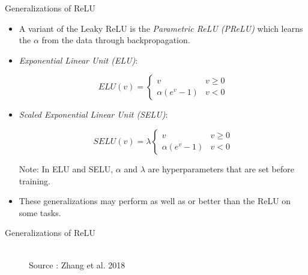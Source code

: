 \begin{frame} {Generalizations of ReLU}
  \begin{itemize}
    \item A variant of the Leaky ReLU is the \emph{Parametric ReLU (PReLU)} which learns the $\alpha$ from the data through backpropagation.

    \item \emph{Exponential Linear Unit (ELU)}:
    
    $$ ELU(v) = \begin{cases} 
          v & v \geq 0 \\
          \alpha (e^v - 1) & v < 0 
       \end{cases} $$

    \item \emph{Scaled Exponential Linear Unit (SELU)}:
    
    $$ SELU(v) = \lambda \begin{cases} 
          v & v \geq 0 \\
          \alpha (e^v - 1) & v < 0 
       \end{cases} $$
  
  {\scriptsize Note: In ELU and SELU, $\alpha$ and $\lambda$ are hyperparameters that are set before training.}
  \item These generalizations may perform as well as or better than the ReLU on some tasks. 
  \end{itemize}

\end{frame}

\begin{frame} {Generalizations of ReLU}
  \lz
  \lz
  \begin{figure}
    \centering
      \tiny{\\ Source : Zhang et al. 2018}
  \end{figure}
\end{frame}

